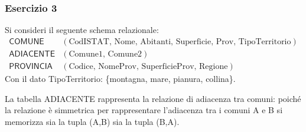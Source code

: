 \documentclass[a4paper]{article}
\begin{document}
	\subsubsection{Esercizio 3}
	
	Si consideri il seguente schema relazionale:
	\begin{equation*}
		\begin{array}{ll}
			\textsf{COMUNE} 	& \left(\text{CodISTAT, Nome, Abitanti, Superficie, Prov, TipoTerritorio}\right) \\ [0.3em]
			\textsf{ADIACENTE} 	& \left(\text{Comune1, Comune2}\right) \\ [0.3em]
			\textsf{PROVINCIA} 	& \left(\text{Codice, NomeProv, SuperficieProv, Regione}\right) 
		\end{array}
	\end{equation*}
	Con il dato TipoTerritorio: \{montagna, mare, pianura, collina\}.\newline
	
	\noindent
	La tabella \textsf{ADIACENTE} rappresenta la relazione di adiacenza tra comuni: poiché la relazione è simmetrica per rappresentare l'adiacenza tra i comuni A e B si memorizza sia la tupla (A,B) sia la tupla (B,A).\newline
	
\end{document}
